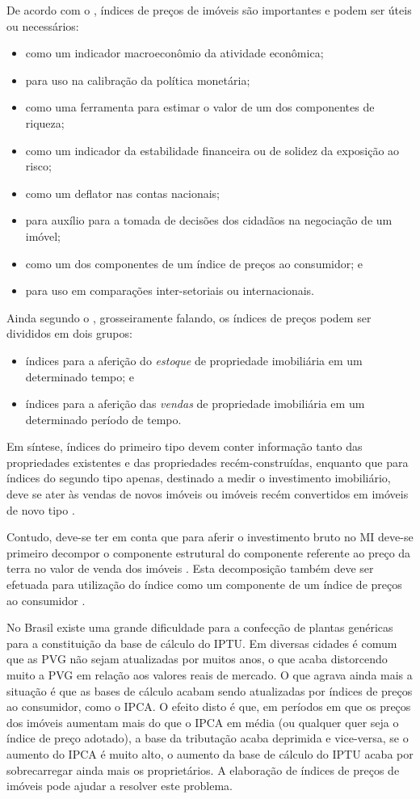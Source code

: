 \documentclass[
	12pt,				%
	oneside,			%
	a4paper,			%
	chapter=TITLE,		%
	section=TITLE,		%
	english,			%
	brazil				%
	]{abntex2}
\begin{document}
De acordo com o \textcite{rppi}, índices de preços de imóveis são importantes e podem ser
úteis ou necessários:
\begin{itemize}
\tightlist
\item
  como um indicador macroeconômio da atividade econômica;
\item
  para uso na calibração da política monetária;
\item
  como uma ferramenta para estimar o valor de um dos componentes de riqueza;
\item
  como um indicador da estabilidade financeira ou de solidez da exposição ao
  risco;
\item
  como um deflator nas contas nacionais;
\item
  para auxílio para a tomada de decisões dos cidadãos na negociação de um imóvel;
\item
  como um dos componentes de um índice de preços ao consumidor; e
\item
  para uso em comparações inter-setoriais ou internacionais.
\end{itemize}
Ainda segundo o \textcite{rppi}, grosseiramente falando, os índices de preços podem ser
divididos em dois grupos:
\begin{itemize}
\tightlist
\item
  índices para a aferição do \emph{estoque} de propriedade imobiliária em um
  determinado tempo; e
\item
  índices para a aferição das \emph{vendas} de propriedade imobiliária em um
  determinado período de tempo.
\end{itemize}
Em síntese, índices do primeiro tipo devem conter informação tanto das
propriedades existentes e das propriedades recém-construídas, enquanto que para
índices do segundo tipo apenas, destinado a medir o investimento imobiliário,
deve se ater às vendas de novos imóveis ou imóveis recém convertidos em imóveis
de novo tipo \autocite[155]{rppi}.

Contudo, deve-se ter em conta que para aferir o investimento bruto no \gls{MI}
deve-se primeiro decompor o componente estrutural do componente
referente ao preço da terra no valor de venda dos imóveis \autocite[155]{rppi}. Esta
decomposição também deve ser efetuada para utilização do índice como um
componente de um índice de preços ao consumidor \autocite[156]{rppi}.

No Brasil existe uma grande dificuldade para a confecção de plantas genéricas
para a constituição da base de cálculo do \gls{IPTU}. Em diversas cidades é
comum que as \gls{PVG} não sejam atualizadas por muitos anos, o que acaba
distorcendo muito a \gls{PVG} em relação aos valores reais de mercado. O que
agrava ainda mais a situação é que as bases de cálculo acabam sendo atualizadas
por índices de preços ao consumidor, como o \gls{IPCA}. O efeito disto é que, em
períodos em que os preços dos imóveis aumentam mais do que o \gls{IPCA} em média
(ou qualquer quer seja o índice de preço adotado), a base da tributação acaba
deprimida e vice-versa, se o aumento do \gls{IPCA} é muito alto, o aumento da
base de cálculo do \gls{IPTU} acaba por sobrecarregar ainda mais os
proprietários. A elaboração de índices de preços de imóveis pode ajudar a
resolver este problema.
\end{document}
